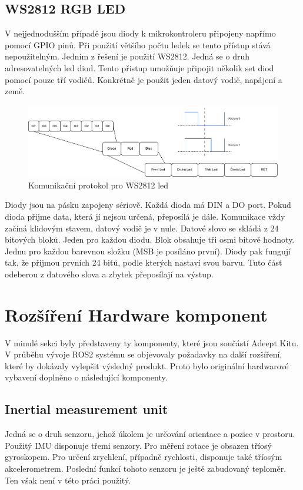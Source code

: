\subsection*{WS2812 RGB LED}
V nejjednodušším případě jsou diody k mikrokontroleru připojeny napřímo pomocí GPIO pinů. Při použití většího počtu ledek se tento přístup stává nepoužitelným. Jedním z řešení je použití WS2812. Jedná se o druh adresovatelných led diod. Tento přistup umožňuje připojit několik set diod pomocí pouze tří vodičů. Konkrétně je použit jeden datový vodič, napájení a země.\cite{ws2812}

\begin{figure}[h!]
	\centering
	\includegraphics[scale=0.55]{obrazky-figures/ws2812_led.pdf}
	\caption{Komunikační protokol pro WS2812 led}
	\label{}
\end{figure}

Diody jsou na pásku zapojeny sériově. Každá dioda má DIN a DO port. Pokud dioda přijme data, která jí nejsou určená, přeposílá je dále. Komunikace vždy začíná klidovým stavem, datový vodič je v nule. Datové slovo se skládá z 24 bitových bloků. Jeden pro každou diodu. Blok obsahuje tři osmi bitové hodnoty. Jednu pro každou barevnou složku (MSB je posíláno první). Diody pak fungují tak, že přijmou prvních 24 bitů, podle kterých nastaví svou barvu. Tuto část odeberou z datového slova a zbytek přeposílají na výstup. \cite{ws2812}

\section{Rozšíření Hardware komponent}
V minulé sekci byly představeny ty komponenty, které jsou součástí Adeept Kitu. V průběhu vývoje ROS2 systému se objevovaly požadavky na další rozšíření, které by dokázaly vylepšit výsledný produkt. Proto bylo originální hardwarové vybavení doplněno o následující komponenty.

\subsection*{Inertial measurement unit}
Jedná se o druh senzoru, jehož úkolem je určování orientace a pozice v prostoru. Použitý IMU disponuje třemi senzory. Pro měření rotace je obsazen tříosý gyroskopem. Pro určení zrychlení, případně rychlosti, disponuje také tříosým akcelerometrem. Poslední funkcí tohoto senzoru je ještě zabudovaný teploměr. Ten však není v této práci použitý.

